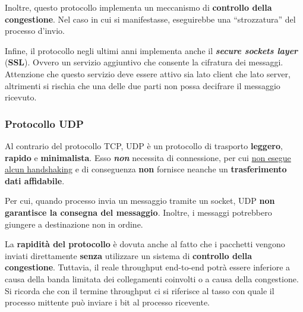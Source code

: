 \documentclass[a4paper]{article}
\newcommand{\dquotes}[1]{``#1''}
\begin{document}
	\noindent
	Inoltre, questo protocollo implementa un meccanismo di \textbf{controllo della congestione}. Nel caso in cui si manifestasse, eseguirebbe una \dquotes{strozzatura} del processo d’invio.\newline
	
	\noindent
	Infine, il protocollo negli ultimi anni implementa anche il \textbf{\emph{secure sockets layer}} (\textbf{SSL}). Ovvero un servizio aggiuntivo che consente la cifratura dei messaggi. Attenzione che questo servizio deve essere attivo sia lato client che lato server, altrimenti si rischia che una delle due parti non possa decifrare il messaggio ricevuto.
	
	\newpage
		
	\subsubsection{Protocollo UDP}\label{protocollo UDP}
	
	Al contrario del protocollo TCP, UDP è un protocollo di trasporto \textbf{leggero}, \textbf{rapido} e \textbf{minimalista}. Esso \emph{\textbf{non}} necessita di connessione, per cui \underline{non esegue} \underline{alcun handshaking} e di conseguenza \textbf{non} fornisce neanche un \textbf{trasferimento dati affidabile}.\newline
	
	\noindent
	Per cui, quando processo invia un messaggio tramite un socket, UDP \textbf{non garantisce la consegna del messaggio}. Inoltre, i messaggi potrebbero giungere a destinazione non in ordine.\newline
	
	\noindent
	La \textbf{rapidità del protocollo} è dovuta anche al fatto che i pacchetti vengono inviati direttamente \textbf{senza} utilizzare un sistema di \textbf{controllo della congestione}. Tuttavia, il reale throughput end-to-end potrà essere inferiore a causa della banda limitata dei collegamenti coinvolti o a causa della congestione. Si ricorda che con il termine throughput ci si riferisce al tasso con quale il processo mittente può inviare i bit al processo ricevente.
	
\end{document}
